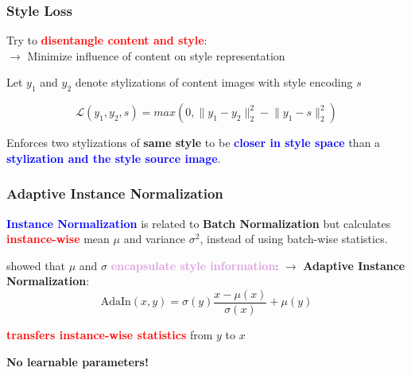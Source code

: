 \documentclass[11pt,xcolor=dvipsnames]{beamer}
\begin{document}
\begin{frame}
	\frametitle{Style Loss}


Try to \textbf{\textcolor{red}{disentangle content and style}}:\\
$\rightarrow$ Minimize influence of content on style representation

\vspace{10pt}

Let $y_1$ and $y_2$ denote stylizations of content images with style encoding $s$

\begin{equation}
	\mathcal{L}(y_1, y_2, s) = max(0, \lVert y_1 - y_2 \rVert^2_2 - \lVert y_1 - s \rVert^2_2)
\end{equation}

Enforces two stylizations of \textbf{same style} to be \textbf{\textcolor{blue}{closer in style space}} than a \textbf{\textcolor{blue}{stylization and the style source image}}.
	
\end{frame}

\begin{frame}
\frametitle{Adaptive Instance Normalization}

\textbf{\textcolor{blue}{Instance Normalization}} is related to \textbf{Batch Normalization} but calculates \textbf{\textcolor{red}{instance-wise}} mean $\mu$ and variance $\sigma^2$, instead of using batch-wise statistics.

\vspace{10pt}

\cite{adain} showed that $\mu$ and $\sigma$ \textbf{\textcolor{Plum}{encapsulate style information}}:
\vspace{10pt}
$\rightarrow$ \textbf{Adaptive Instance Normalization}:
\begin{equation*}
	\text{AdaIn}(x, y) = \sigma(y) \frac{x - \mu(x)}{\sigma(x)} + \mu(y)
\end{equation*}
\vspace{10pt}

\textbf{\textcolor{red}{transfers instance-wise statistics}} from $y$ to $x$

\vspace{10pt}

\textbf{No learnable parameters!}

\end{frame}
\end{document}
